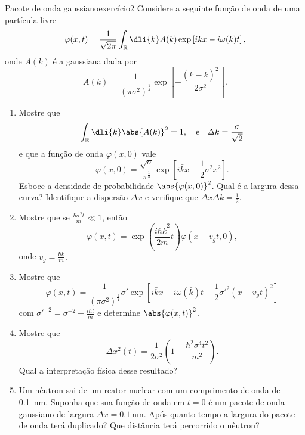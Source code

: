 \begin{exercício}{Pacote de onda gaussiano}{exercício2}
    Considere a seguinte função de onda de uma partícula livre
    \begin{equation*}
        \varphi(x,t) = \frac{1}{\sqrt{2\pi}} \int_{\mathbb{R}} \dli{k} A(k) \exp\left[ikx - i\omega(k) t\right],
    \end{equation*}
    onde \(A(k)\) é a gaussiana dada por
    \begin{equation*}
        A(k) = \frac{1}{(\pi \sigma^2)^{\frac14}} \exp\left[-\frac{(k - \bar{k})^2}{2 \sigma^2}\right].
    \end{equation*}
    \begin{enumerate}[label=(\alph*)]
        \item Mostre que
            \begin{equation*}
                \int_{\mathbb{R}} \dli{k} \abs{A(k)}^2 = 1, \quad\text{e}\quad \Delta k = \frac{\sigma}{\sqrt{2}}
            \end{equation*}
            e que a função de onda \(\varphi(x,0)\) vale
            \begin{equation*}
                \varphi(x,0) = \frac{\sqrt{\sigma}}{\pi^{\frac14}}\exp\left[i \bar{k} x - \frac12 \sigma^2 x^2\right].
            \end{equation*}
            Esboce a densidade de probabilidade \(\abs{\varphi(x,0)}^2\). Qual é a largura dessa curva? Identifique a dispersão \(\Delta x\) e verifique que \(\Delta x \Delta k = \frac12\).
        \item Mostre que se \(\frac{\hbar \sigma^2 t}{m} \ll 1\), então
            \begin{equation*}
                \varphi(x,t) = \exp\left(\frac{i\hbar \bar{k}^2}{2m}t\right)\varphi(x - v_gt, 0),
            \end{equation*}
            onde \(v_g = \frac{\hbar \bar{k}}{m}.\)
        \item Mostre que
            \begin{equation*}
                \varphi(x,t) = \frac{1}{(\pi \sigma^2)^{\frac14}} \sigma'\exp\left[i\bar{k}x - i \omega(\bar{k}) t  - \frac12 \sigma'^2 (x - v_gt)^2\right]
            \end{equation*}
            com \(\sigma'^{-2} = \sigma^{-2} + \frac{i \hbar t}{m}\) e determine \(\abs{\varphi(x,t)}^2\).
        \item Mostre que
            \begin{equation*}
                \Delta x^2(t) = \frac{1}{2\sigma^2}\left(1 + \frac{\hbar^2 \sigma^4 t^2}{m^2}\right).
            \end{equation*}
            Qual a interpretação física desse resultado?
        \item Um nêutron sai de um reator nuclear com um comprimento de onda de \SI{0.1}{\nano\meter}. Suponha que sua função de onda em \(t = 0\) é um pacote de onda gaussiano de largura \(\Delta x = \SI{0.1}{\nano\meter}.\) Após quanto tempo a largura do pacote de onda terá duplicado? Que distância terá percorrido o nêutron?
    \end{enumerate}
\end{exercício}
